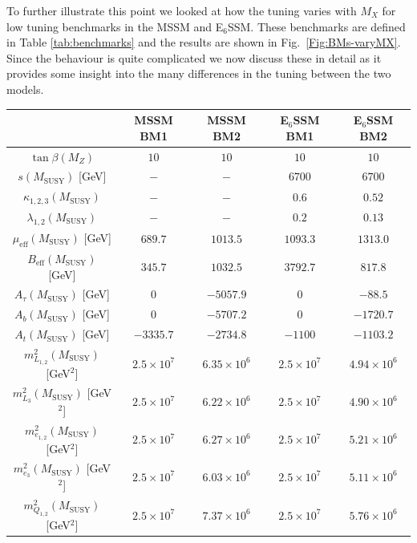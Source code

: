 \documentclass[preprint,amsmath,amssymb,aps,superscriptaddress,prd,
showpacs,floatfix,nofootinbib]{revtex4-1}
\begin{document}
To further illustrate this point we looked at how the tuning varies
with $M_X$ for low tuning benchmarks in the MSSM and E$_6$SSM.  These
benchmarks are defined in Table \ref{tab:benchmarks} and the results
are shown in Fig.~\ref{Fig:BMs-varyMX}.  Since the behaviour is quite
complicated we now discuss these in detail as it provides some insight
into the many differences in the tuning between the two models.

\begingroup
\squeezetable
\begin{table}[h]
\centering
\begin{ruledtabular}
\begin{tabular}{ccccc}
& MSSM BM1 & MSSM BM2 & E$_6$SSM BM1 & E$_6$SSM BM2 \\
\hline
$\tan\beta(M_Z)$ & $10$ & $10$ & $10$ & $10$ \\
$s(M_{\mathrm{SUSY}})$ [GeV] & $-$ & $-$ & $6700$ & $6700$ \\
$\kappa_{1,2,3}(M_{\mathrm{SUSY}})$ & $-$ & $-$ & $0.6$ & $0.52$ \\
$\lambda_{1,2}(M_{\mathrm{SUSY}})$ & $-$ & $-$ & $0.2$ & $0.13$ \\
$\mu_{\mathrm{eff}}(M_{\mathrm{SUSY}})$ [GeV] & $689.7$ & $1013.5$ &
$1093.3$ & $1313.0$ \\
$B_{\mathrm{eff}}(M_{\mathrm{SUSY}})$ [GeV] & $345.7$ & $1032.5$ &
$3792.7$ & $817.8$ \\
$A_\tau(M_{\mathrm{SUSY}})$ [GeV] & $0$ & $-5057.9$ & $0$ & $-88.5$ \\
$A_b(M_{\mathrm{SUSY}})$ [GeV] & $0$ & $-5707.2$ & $0$ & $-1720.7$\\
$A_t(M_{\mathrm{SUSY}})$ [GeV] & $-3335.7$ & $-2734.8$ & $-1100$ & $-1103.2$ \\
$m_{L_{1,2}}^2(M_{\mathrm{SUSY}})$ [GeV$^2$] & $2.5\times 10^7$ &
$6.35\times 10^6$ & $2.5\times 10^7$ & $4.94\times 10^6$ \\
$m_{L_3}^2(M_{\mathrm{SUSY}})$ [GeV$^2$] & $2.5\times 10^7$ &
$6.22\times 10^6$ & $2.5\times 10^7$ & $4.90\times 10^6$ \\
$m_{e_{1,2}}^2(M_{\mathrm{SUSY}})$ [GeV$^2$] & $2.5\times 10^7$ &
$6.27\times 10^6$ & $2.5\times 10^7$ & $5.21\times 10^6$ \\
$m_{e_3}^2(M_{\mathrm{SUSY}})$ [GeV$^2$] & $2.5\times 10^7$ &
$6.03\times 10^6$ & $2.5\times 10^7$ & $5.11\times 10^6$ \\
$m_{Q_{1,2}}^2(M_{\mathrm{SUSY}})$ [GeV$^2$] & $2.5\times 10^7$ &
$7.37\times 10^6$ & $2.5\times 10^7$ & $5.76\times 10^6$ \\

\end{tabular}
\end{ruledtabular}
\end{table}
\end{document}
